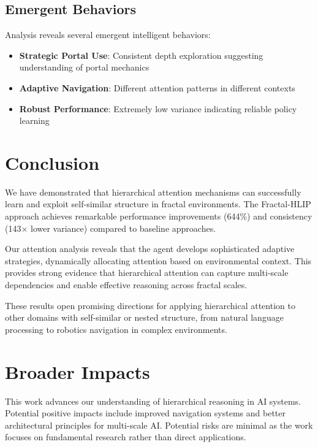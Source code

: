 \documentclass[11pt,a4paper]{article}
\begin{document}
\subsection{Emergent Behaviors}

Analysis reveals several emergent intelligent behaviors:
\begin{itemize}
    \item \textbf{Strategic Portal Use}: Consistent depth exploration suggesting understanding of portal mechanics
    \item \textbf{Adaptive Navigation}: Different attention patterns in different contexts
    \item \textbf{Robust Performance}: Extremely low variance indicating reliable policy learning
\end{itemize}

\section{Conclusion}

We have demonstrated that hierarchical attention mechanisms can successfully learn and exploit self-similar structure in fractal environments. The Fractal-HLIP approach achieves remarkable performance improvements (644\%) and consistency (143× lower variance) compared to baseline approaches.

Our attention analysis reveals that the agent develops sophisticated adaptive strategies, dynamically allocating attention based on environmental context. This provides strong evidence that hierarchical attention can capture multi-scale dependencies and enable effective reasoning across fractal scales.

These results open promising directions for applying hierarchical attention to other domains with self-similar or nested structure, from natural language processing to robotics navigation in complex environments.

\section*{Broader Impacts}

This work advances our understanding of hierarchical reasoning in AI systems. Potential positive impacts include improved navigation systems and better architectural principles for multi-scale AI. Potential risks are minimal as the work focuses on fundamental research rather than direct applications.



\end{document}
